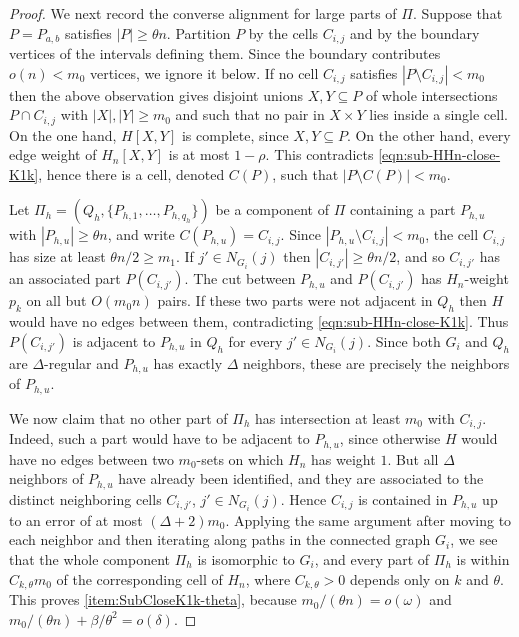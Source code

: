 \begin{proof}
We next record the converse alignment for large parts of $\Pi$. Suppose that $P=P_{a,b}$ satisfies $|P|\geq\theta n$. Partition $P$ by the cells $C_{i,j}$ and by the boundary vertices of the intervals defining them. Since the boundary contributes $o(n)<m_0$ vertices, we ignore it below. If no cell $C_{i,j}$ satisfies $|P\setminus C_{i,j}|<m_0$ then the above observation gives disjoint unions $X,Y\subseteq P$ of whole intersections $P\cap C_{i,j}$ with $|X|,|Y|\geq m_0$ and such that no pair in $X\times Y$ lies inside a single cell. On the one hand, $H[X,Y]$ is complete, since $X,Y\subseteq P$. On the other hand, every edge weight of $H_n[X,Y]$ is at most $1-\rho$. This contradicts \eqref{eqn:sub-HHn-close-K1k}, hence there is a cell, denoted $C(P)$, such that $|P\setminus C(P)|<m_0$.

Let $\Pi_h=(Q_h,\{P_{h,1},\dots,P_{h,q_h}\})$ be a component of $\Pi$ containing a part $P_{h,u}$ with $|P_{h,u}|\geq\theta n$, and write $C(P_{h,u})=C_{i,j}$. Since $|P_{h,u}\setminus C_{i,j}|<m_0$, the cell $C_{i,j}$ has size at least $\theta n/2\geq m_1$. If $j'\in N_{G_i}(j)$ then $|C_{i,j'}|\geq\theta n/2$, and so $C_{i,j'}$ has an associated part $P(C_{i,j'})$. The cut between $P_{h,u}$ and $P(C_{i,j'})$ has $H_n$-weight $p_k$ on all but $O(m_0n)$ pairs. If these two parts were not adjacent in $Q_h$ then $H$ would have no edges between them, contradicting \eqref{eqn:sub-HHn-close-K1k}. Thus $P(C_{i,j'})$ is adjacent to $P_{h,u}$ in $Q_h$ for every $j'\in N_{G_i}(j)$. Since both $G_i$ and $Q_h$ are $\Delta$-regular and $P_{h,u}$ has exactly $\Delta$ neighbors, these are precisely the neighbors of $P_{h,u}$.

We now claim that no other part of $\Pi_h$ has intersection at least $m_0$ with $C_{i,j}$. Indeed, such a part would have to be adjacent to $P_{h,u}$, since otherwise $H$ would have no edges between two $m_0$-sets on which $H_n$ has weight $1$. But all $\Delta$ neighbors of $P_{h,u}$ have already been identified, and they are associated to the distinct neighboring cells $C_{i,j'}$, $j'\in N_{G_i}(j)$. Hence $C_{i,j}$ is contained in $P_{h,u}$ up to an error of at most $(\Delta+2)m_0$. Applying the same argument after moving to each neighbor and then iterating along paths in the connected graph $G_i$, we see that the whole component $\Pi_h$ is isomorphic to $G_i$, and every part of $\Pi_h$ is within $C_{k,\theta}m_0$ of the corresponding cell of $H_n$, where $C_{k,\theta}>0$ depends only on $k$ and $\theta$. This proves \ref{item:SubCloseK1k-theta}, because $m_0/(\theta n)=o(\omega)$ and $m_0/(\theta n)+\beta/\theta^2=o(\delta)$.


\end{proof}
